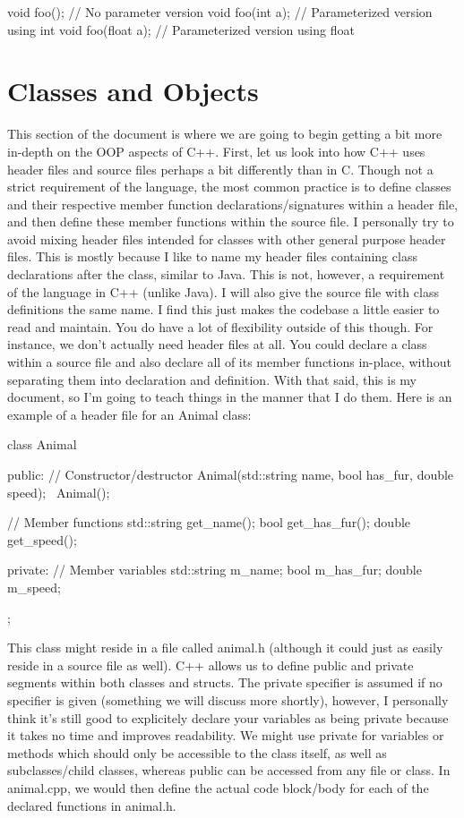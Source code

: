 \documentclass{article}
\begin{document}
\begin{cpplst}
void foo();         // No parameter version
void foo(int a);    // Parameterized version using int
void foo(float a);  // Parameterized version using float
\end{cpplst}

\section{Classes and Objects}

This section of the document is where we are going to begin getting a bit more in-depth on the OOP aspects of
C++. First, let us look into how C++ uses header files and source files perhaps a bit differently than in C.
Though not a strict requirement of the language, the most common practice is to define classes and their
respective member function declarations/signatures within a header file, and then define these member functions
within the source file. I personally try to avoid mixing header files intended for classes with other general
purpose header files. This is mostly because I like to name my header files containing class declarations after
the class, similar to Java. This is not, however, a requirement of the language in C++ (unlike Java). I will
also give the source file with class definitions the same name. I find this just makes the codebase a little
easier to read and maintain. You do have a lot of flexibility outside of this though. For instance, we don't
actually need header files at all. You could declare a class within a source file and also declare all of its
member functions in-place, without separating them into declaration and definition. With that said, this is
my document, so I’m going to teach things in the manner that I do them. Here is an example of a header file
for an Animal class:

\begin{cpplst}
class Animal
{
    public:
    // Constructor/destructor
    Animal(std::string name, bool has_fur, double speed);
    ~Animal();

    // Member functions
    std::string get_name();
    bool get_has_fur();
    double get_speed();

private:
	// Member variables
	std::string m_name;
	bool m_has_fur;
	double m_speed;
};
\end{cpplst}

This class might reside in a file called animal.h (although it could just as easily reside in a source file as
well). C++ allows us to define public and private segments within both classes and structs. The private
specifier is assumed if no specifier is given (something we will discuss more shortly), however, I personally
think it's still good to explicitely declare your variables as being private because it takes no time and
improves readability. We might use private for variables or methods which should only be accessible to the
class itself, as well as subclasses/child classes, whereas public can be accessed from any file or class. In
animal.cpp, we would then define the actual code block/body for each of the declared functions in animal.h.
\end{document}
